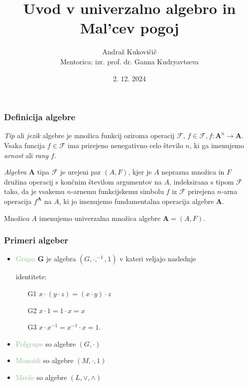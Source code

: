 \documentclass{beamer}
\title{Uvod v univerzalno algebro in Mal'cev pogoj}
\author{Andraž Kukovičič \\ {\small Mentorica: izr. prof. dr. Ganna Kudryavtseva \\}}
\institute{Fakulteta za matematiko in fiziko}
\date{2. 12. 2024}
\newcommand{\FF}{$\mathcal{F}$ }
\begin{document}
\frame{\titlepage}

\begin{frame}
\frametitle{Definicija algebre}

\emph{Tip} ali \emph{jezik} algebre je množica funkcij oziroma operacij $\mathcal{F}$,  $f \in \mathcal{F}, f:\mathbf{A}^n \rightarrow \mathbf{A}$.
Vsaka funcija $f \in 
\mathcal{F}$ ima prirejeno nenegativno celo število $n$, ki ga imenujemo \emph{arnost} ali 
\emph{rang} $f$. \\
\pause
\begin{block}{}

\emph{Algebra} $\mathbf{A}$ tipa $\mathcal{F}$ je urejeni par $ \left(A, F\right)$, kjer je $A$ neprazna množica 
in $F$ družina operacij s končnim številom argumentov na $A$, indeksirana s tipom \FF tako, 
da je vsakemu $n$-arnemu funkcijskemu simbolu $f$ iz \FF prirejena $n$-arna operacija $f^\mathbf{A}$ 
na $A$, ki jo imenujemo fundamentalna operacija algebre $\mathbf{A}$. \\

\end{block}
\pause
Množico $A$ imenujemo univerzalna množica algebre $\mathbf{A}  = \left(A, F\right)$. \\
\end{frame}

\begin{frame}
    \frametitle{Primeri algeber}
    \begin{itemize}
        \item \textcolor{darkseagreen}{Grupa} $\mathbf{G}$ je algebra $\left(G, \cdot, ^{-1}, 1\right)$ v kateri veljajo naslednje
        \item[] identitete:
        \begin{itemize}
            \item[G1] $x \cdot \left(y \cdot z\right) = \left(x \cdot y\right) \cdot z$
            \item[G2] $x \cdot 1 = 1 \cdot x = x$
            \item[G3] $x \cdot x^{-1} = x^{-1} \cdot x = 1$.
        \end{itemize}
    \pause
        \item \textcolor{darkseagreen}{Polgrupe} so algebre $\left(G, \cdot\right)$
        \item \textcolor{darkseagreen}{Monoidi} so algebre  $\left(M, \cdot, 1\right)$
        \item \textcolor{darkseagreen}{Mreže} so algebre $\left(L,\vee, \wedge\right)$ 
    \end{itemize}
\end{frame}
\end{document}
